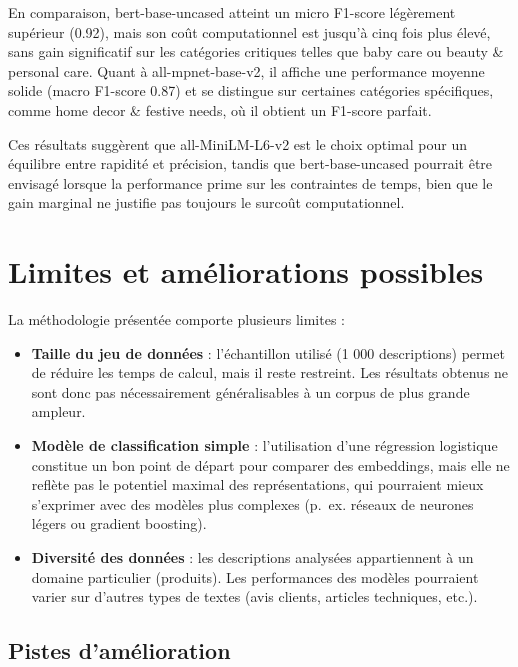 \documentclass[
  french,
  letterpaper,
  DIV=11,
  numbers=noendperiod]{scrartcl}
\providecommand{\tightlist}{%
  \setlength{\itemsep}{0pt}\setlength{\parskip}{0pt}}
\begin{document}
En comparaison, bert-base-uncased atteint un micro F1-score légèrement
supérieur (0.92), mais son coût computationnel est jusqu'à cinq fois
plus élevé, sans gain significatif sur les catégories critiques telles
que baby care ou beauty \& personal care. Quant à all-mpnet-base-v2, il
affiche une performance moyenne solide (macro F1-score 0.87) et se
distingue sur certaines catégories spécifiques, comme home decor \&
festive needs, où il obtient un F1-score parfait.

Ces résultats suggèrent que all-MiniLM-L6-v2 est le choix optimal pour
un équilibre entre rapidité et précision, tandis que bert-base-uncased
pourrait être envisagé lorsque la performance prime sur les contraintes
de temps, bien que le gain marginal ne justifie pas toujours le surcoût
computationnel.

\section{Limites et améliorations
possibles}\label{limites-et-amuxe9liorations-possibles}

La méthodologie présentée comporte plusieurs limites :

\begin{itemize}
\tightlist
\item
  \textbf{Taille du jeu de données} : l'échantillon utilisé (1 000
  descriptions) permet de réduire les temps de calcul, mais il reste
  restreint. Les résultats obtenus ne sont donc pas nécessairement
  généralisables à un corpus de plus grande ampleur.
\item
  \textbf{Modèle de classification simple} : l'utilisation d'une
  régression logistique constitue un bon point de départ pour comparer
  des embeddings, mais elle ne reflète pas le potentiel maximal des
  représentations, qui pourraient mieux s'exprimer avec des modèles plus
  complexes (p.~ex. réseaux de neurones légers ou gradient boosting).
\item
  \textbf{Diversité des données} : les descriptions analysées
  appartiennent à un domaine particulier (produits). Les performances
  des modèles pourraient varier sur d'autres types de textes (avis
  clients, articles techniques, etc.).
\end{itemize}

\subsection{Pistes d'amélioration}\label{pistes-damuxe9lioration}
\end{document}
